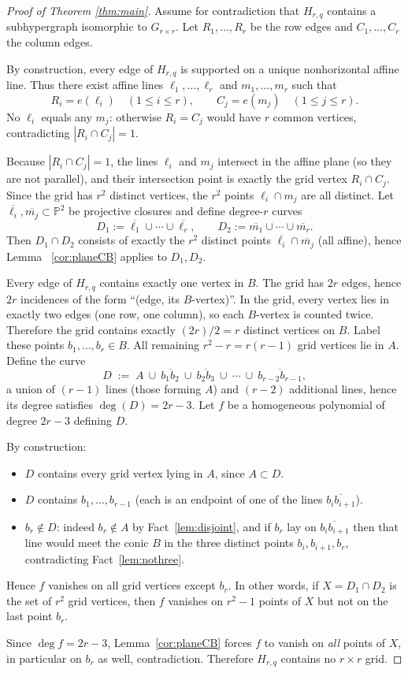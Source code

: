 \documentclass[10pt,a4paper]{amsart}
\newcommand{\PP}{\mathbb{P}}
\begin{document}
\begin{proof}[Proof of Theorem \ref{thm:main}]
Assume for contradiction that $H_{r,q}$ contains a subhypergraph isomorphic to $G_{r\times r}$.
Let $R_1,\dots,R_r$ be the row edges and $C_1,\dots,C_r$ the column edges.

By construction, every edge of $H_{r,q}$ is supported on a unique nonhorizontal affine line.
Thus there exist affine lines $\ell_1,\dots,\ell_r$ and $m_1,\dots,m_r$ such that
\[
R_i=e(\ell_i)\quad(1\le i\le r),
\qquad
C_j=e(m_j)\quad(1\le j\le r).
\]
No $\ell_i$ equals any $m_j$: otherwise $R_i=C_j$ would have $r$ common vertices, contradicting $|R_i\cap C_j|=1$.

Because $|R_i\cap C_j|=1$, the lines $\ell_i$ and $m_j$ intersect in the affine plane (so they are not parallel),
and their intersection point is exactly the grid vertex $R_i\cap C_j$.
Since the grid has $r^2$ distinct vertices, the $r^2$ points $\ell_i\cap m_j$ are all distinct. Let $\overline{\ell_i},\overline{m_j}\subset \PP^2$ be projective closures and define degree-$r$ curves
\[
D_1 := \overline{\ell_1}\cup\cdots\cup \overline{\ell_r},
\qquad
D_2 := \overline{m_1}\cup\cdots\cup \overline{m_r}.
\]
Then $D_1\cap D_2$ consists of exactly the $r^2$ distinct points $\overline{\ell_i}\cap \overline{m_j}$
(all affine), hence Lemma ~\ref{cor:planeCB} applies to $D_1,D_2$.

Every edge of $H_{r,q}$ contains exactly one vertex in $B$.
The grid has $2r$ edges, hence $2r$ incidences of the form ``(edge, its $B$-vertex)''.
In the grid, every vertex lies in exactly two edges (one row, one column), so each $B$-vertex is counted twice.
Therefore the grid contains exactly $(2r)/2=r$ distinct vertices on $B$.
Label these points $b_1,\dots,b_r\in B$.
All remaining $r^2-r=r(r-1)$ grid vertices lie in $A$. Define the curve
\[
D \;:=\; A\ \cup\ \overline{b_1b_2}\ \cup\ \overline{b_2b_3}\ \cup\ \cdots\ \cup\ \overline{b_{r-2}b_{r-1}},
\]
a union of $(r-1)$ lines (those forming $A$) and $(r-2)$ additional lines, hence its degree satisfies $\deg(D)=2r-3$.
Let $f$ be a homogeneous polynomial of degree $2r-3$ defining $D$.

By construction:
\begin{itemize}[leftmargin=2em]
\item $D$ contains every grid vertex lying in $A$, since $A\subset D$.
\item $D$ contains $b_1,\dots,b_{r-1}$ (each is an endpoint of one of the lines $\overline{b_ib_{i+1}}$).
\item $b_r\notin D$: indeed $b_r\notin A$ by Fact~\ref{lem:disjoint}, and if $b_r$ lay on
$\overline{b_ib_{i+1}}$ then that line would meet the conic $B$ in the three distinct points
$b_i,b_{i+1},b_r$, contradicting Fact~\ref{lem:nothree}.
\end{itemize}
Hence $f$ vanishes on all grid vertices except $b_r$. In other words, if $X=D_1\cap D_2$ is the set of $r^2$ grid vertices, then $f$ vanishes on $r^2-1$ points of $X$
but not on the last point $b_r$.

Since $\deg f = 2r-3$, Lemma~\ref{cor:planeCB} forces $f$ to vanish on \emph{all} points of $X$,
in particular on $b_r$ as well, contradiction. Therefore $H_{r,q}$ contains no $r\times r$ grid.
\end{proof}
\end{document}
